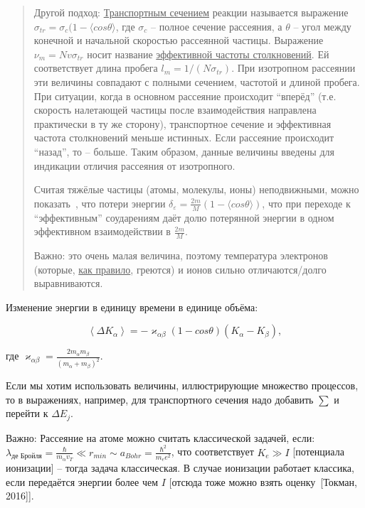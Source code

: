 \documentclass[10pt, a4paper]{article}
\numberwithin{equation}{section}
\newcommand{\Tokman}{~[Токман, 2016]}
\begin{document}
\begin{quotation}

Другой подход\cite{raizer}: \uline{Транспортным сечением} реакции называется выражение $\sigma_{tr} = \sigma_c(1-\langle {cos\theta}\rangle$, где $\sigma_c$ -- полное сечение рассеяния, а $\theta$ -- угол между конечной и начальной скоростью рассеянной частицы. Выражение $\nu_m = Nv\sigma_{tr}$ носит название \uline{эффективной частоты столкновений}. Ей соответствует длина пробега $l_m = 1/(N\sigma_{tr})$. При изотропном рассеянии эти величины совпадают с полными сечением, частотой и длиной пробега. При ситуации, когда в основном рассеяние происходит ``вперёд'' (т.е. скорость налетающей частицы после взаимодействия направлена практически в ту же сторону), транспортное сечение и эффективная частота столкновений меньше истинных. Если рассеяние происходит ``назад'', то -- больше. Таким образом, данные величины введены для индикации отличия рассеяния от изотропного.

Считая тяжёлые частицы (атомы, молекулы, ионы) неподвижными, можно показать~\cite{raizer}, что потери энергии $\delta_\varepsilon = \frac{2m}{M}(1-\langle cos\theta\rangle)$, что при переходе к ``эффективным'' соударениям даёт долю потерянной энергии в одном эффективном взаимодействии в $\frac{2m}{M}$. 

Важно: это очень малая величина, поэтому температура электронов (которые, \uline{как правило}, греются) и ионов сильно отличаются/долго выравниваются.

\end{quotation}

Изменение энергии в единицу времени в единице объёма:

\begin{equation*}
	\left \langle \Delta K_\alpha \right \rangle = - \varkappa_{\alpha\beta} (1-cos\theta) (K_\alpha-K_\beta),
\end{equation*}

где $\varkappa_{\alpha\beta} = \frac{2m_\alpha m_\beta}{(m_\alpha+m_\beta)^2}$.

Если мы хотим использовать величины, иллюстрирующие множество процессов, то в выражениях, например, для транспортного сечения надо добавить $\sum$ и перейти к $\Delta E_j$. 

Важно: Рассеяние на атоме можно считать классической задачей, если: $\lambda_\text{де Бройля} = \frac{\hbar}{m_\alpha v_T} \ll r_{min} \sim a_{Bohr} = \frac{\hbar^2}{m_e e^2}$, что соответствует $K_e \gg I$ [потенциала ионизации] -- тогда задача классическая. В случае ионизации работает классика, если передаётся энергии более чем $I$ [отсюда тоже можно взять оценку\Tokman].
\end{document}
